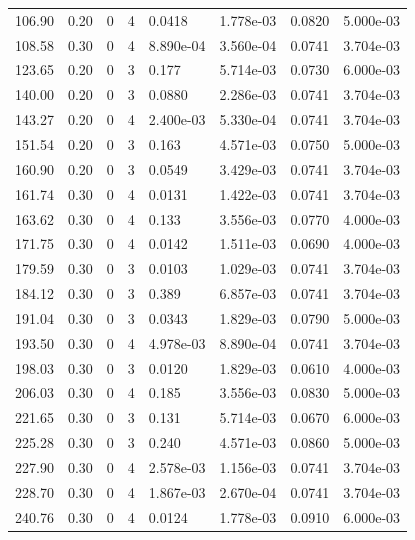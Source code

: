 \documentclass[preview]{standalone}
\begin{document}
{{\begin{tabular}{L{1.2cm}C{1.2cm} C{0.3cm}C{0.5cm} C{1.4cm}C{1.4cm} C{1.4cm}C{1.4cm}}
  106.90  &  0.20  & 0     &  4 &  0.0418  & 1.778e-03  & 0.0820 &  5.000e-03   \\ 
  108.58  &  0.30  & 0     &  4 &  8.890e-04  & 3.560e-04  & 0.0741 &  3.704e-03   \\ 
  123.65  &  0.20  & 0     &  3 &  0.177  & 5.714e-03  & 0.0730 &  6.000e-03   \\ 
  140.00  &  0.20  & 0     &  3 &  0.0880  & 2.286e-03  & 0.0741 &  3.704e-03   \\ 
  143.27  &  0.20  & 0     &  4 &  2.400e-03  & 5.330e-04  & 0.0741 &  3.704e-03   \\ 
  151.54  &  0.20  & 0     &  3 &  0.163  & 4.571e-03  & 0.0750 &  5.000e-03   \\ 
  160.90  &  0.20  & 0     &  3 &  0.0549  & 3.429e-03  & 0.0741 &  3.704e-03   \\ 
  161.74  &  0.30  & 0     &  4 &  0.0131  & 1.422e-03  & 0.0741 &  3.704e-03   \\ 
  163.62  &  0.30  & 0     &  4 &  0.133  & 3.556e-03  & 0.0770 &  4.000e-03   \\ 
  171.75  &  0.30  & 0     &  4 &  0.0142  & 1.511e-03  & 0.0690 &  4.000e-03   \\ 
  179.59  &  0.30  & 0     &  3 &  0.0103  & 1.029e-03  & 0.0741 &  3.704e-03   \\ 
  184.12  &  0.30  & 0     &  3 &  0.389  & 6.857e-03  & 0.0741 &  3.704e-03   \\ 
  191.04  &  0.30  & 0     &  3 &  0.0343  & 1.829e-03  & 0.0790 &  5.000e-03   \\ 
  193.50  &  0.30  & 0     &  4 &  4.978e-03  & 8.890e-04  & 0.0741 &  3.704e-03   \\ 
  198.03  &  0.30  & 0     &  3 &  0.0120  & 1.829e-03  & 0.0610 &  4.000e-03   \\ 
  206.03  &  0.30  & 0     &  4 &  0.185  & 3.556e-03  & 0.0830 &  5.000e-03   \\ 
  221.65  &  0.30  & 0     &  3 &  0.131  & 5.714e-03  & 0.0670 &  6.000e-03   \\ 
  225.28  &  0.30  & 0     &  3 &  0.240  & 4.571e-03  & 0.0860 &  5.000e-03   \\ 
  227.90  &  0.30  & 0     &  4 &  2.578e-03  & 1.156e-03  & 0.0741 &  3.704e-03   \\ 
  228.70  &  0.30  & 0     &  4 &  1.867e-03  & 2.670e-04  & 0.0741 &  3.704e-03   \\ 
  240.76  &  0.30  & 0     &  4 &  0.0124  & 1.778e-03  & 0.0910 &  6.000e-03   \\ 

\end{tabular}}}
\end{document}
